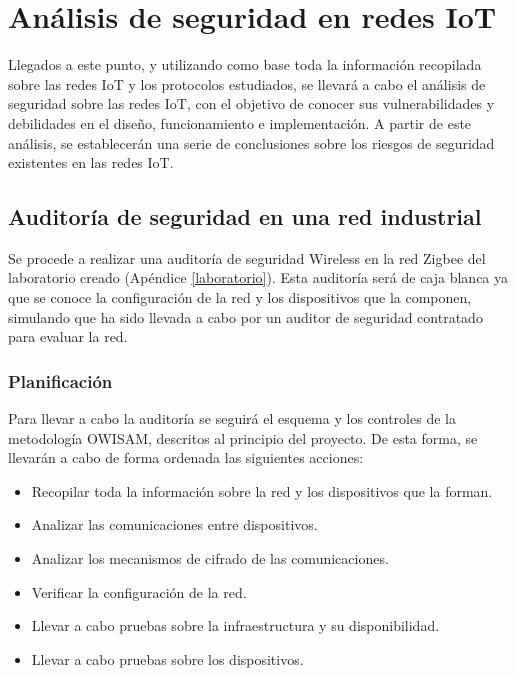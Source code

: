 \chapter{Análisis de seguridad en redes IoT} %
Llegados a este punto, y utilizando como base toda la información recopilada sobre las redes IoT y los protocolos estudiados, se llevará a cabo el análisis de seguridad sobre las redes IoT, con el objetivo de conocer sus vulnerabilidades y debilidades en el diseño, funcionamiento e implementación. A partir de este análisis, se establecerán una serie de conclusiones sobre los riesgos de seguridad existentes en las redes IoT.




\section{Auditoría de seguridad en una red industrial} %
Se procede a realizar una auditoría de seguridad Wireless en la red Zigbee del laboratorio creado (Apéndice \ref{laboratorio}). Esta auditoría será de caja blanca ya que se conoce la conﬁguración de la red y los dispositivos que la componen, simulando que ha sido llevada a cabo por un auditor de seguridad contratado para evaluar la red.
\subsection{Planificación} %
Para llevar a cabo la auditoría se seguirá el esquema y los controles de la metodología OWISAM, descritos al principio del proyecto. De esta forma, se llevarán a cabo de forma ordenada las siguientes acciones:
\begin{itemize}
\item Recopilar toda la información sobre la red y los dispositivos que la forman.
\item Analizar las comunicaciones entre dispositivos.
\item Analizar los mecanismos de cifrado de las comunicaciones.
\item Veriﬁcar la conﬁguración de la red.
\item Llevar a cabo pruebas sobre la infraestructura y su disponibilidad.
\item Llevar a cabo pruebas sobre los dispositivos.
\end{itemize}
\clearpage




